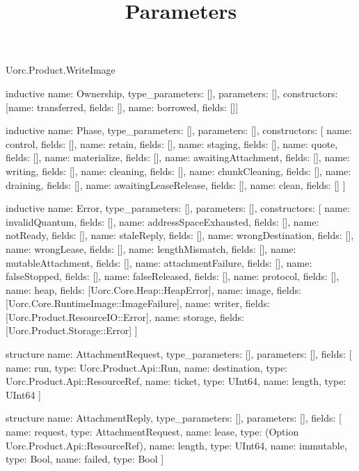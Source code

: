 \begin{lexlean}{Uorc.Product.WriteImage}
\title{Parameters}
\begin{semanticmodule}
inductive{
  name: Ownership,
  type_parameters: [],
  parameters: [],
  constructors: [{name: transferred, fields: []}, {name: borrowed, fields: []}]
}

inductive{
  name: Phase,
  type_parameters: [],
  parameters: [],
  constructors: [
    {name: control, fields: []},
    {name: retain, fields: []},
    {name: staging, fields: []},
    {name: quote, fields: []},
    {name: materialize, fields: []},
    {name: awaitingAttachment, fields: []},
    {name: writing, fields: []},
    {name: cleaning, fields: []},
    {name: chunkCleaning, fields: []},
    {name: draining, fields: []},
    {name: awaitingLeaseRelease, fields: []},
    {name: clean, fields: []}
  ]
}

inductive{
  name: Error,
  type_parameters: [],
  parameters: [],
  constructors: [
    {name: invalidQuantum, fields: []},
    {name: addressSpaceExhausted, fields: []},
    {name: notReady, fields: []},
    {name: staleReply, fields: []},
    {name: wrongDestination, fields: []},
    {name: wrongLease, fields: []},
    {name: lengthMismatch, fields: []},
    {name: mutableAttachment, fields: []},
    {name: attachmentFailure, fields: []},
    {name: falseStopped, fields: []},
    {name: falseReleased, fields: []},
    {name: protocol, fields: []},
    {name: heap, fields: [Uorc.Core.Heap::HeapError]},
    {name: image, fields: [Uorc.Core.RuntimeImage::ImageFailure]},
    {name: writer, fields: [Uorc.Product.ResourceIO::Error]},
    {name: storage, fields: [Uorc.Product.Storage::Error]}
  ]
}

structure{
  name: AttachmentRequest,
  type_parameters: [],
  parameters: [],
  fields: [
    {name: run, type: Uorc.Product.Api::Run},
    {name: destination, type: Uorc.Product.Api::ResourceRef},
    {name: ticket, type: UInt64},
    {name: length, type: UInt64}
  ]
}

structure{
  name: AttachmentReply,
  type_parameters: [],
  parameters: [],
  fields: [
    {name: request, type: AttachmentRequest},
    {name: lease, type: (Option Uorc.Product.Api::ResourceRef)},
    {name: length, type: UInt64},
    {name: immutable, type: Bool},
    {name: failed, type: Bool}
  ]
}


\end{semanticmodule}
\end{lexlean}
